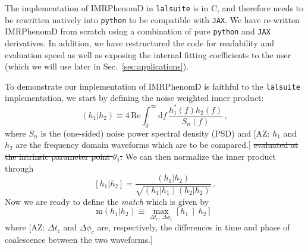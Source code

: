 \documentclass[twocolumn]{aastex631}
\newcommand{\jax}{\texttt{JAX}\xspace}
\newcommand{\lalsuite}{\texttt{lalsuite}\xspace}
\newcommand{\AZ}[1]{{\color{Burnt}[AZ: #1]}}
\begin{document}
The implementation of IMRPhenomD in \lalsuite is in C, and therefore needs to be rewritten natively into \texttt{python} to be compatible with \jax.
We have re-written IMRPhenomD from scratch using a combination of pure \texttt{python} and \jax derivatives.
In addition, we have restructured the code for readability and evaluation speed as well as exposing the internal fitting coefficients to the user (which we will use later in Sec.~\ref{sec:applications}).

To demonstrate our implementation of IMRPhenomD is faithful to the \lalsuite implementation, we start by defining the noise weighted inner product:
\begin{equation}
    \label{eq:inner_prod}
    \left(h_1|h_2\right) \equiv 4 \, \mathrm{Re} \int^{\infty}_{0} \mathrm{d} f \, \frac{ h^*_1(f) h_2(f)}{S_n(f)}\, ,
\end{equation}
where $S_n$ is the (one-sided) noise power spectral density (PSD) and \AZ{$h_1$ and $h_2$ are the frequency domain waveforms which are to be compared.}
\sout{ evaluated at the intrinsic parameter point $\theta_1$.}
We can then normalize the inner product through
\begin{equation}
    \left[h_1|h_2\right] = \frac{\left(h_1|h_2\right)}{\sqrt{\left(h_1|h_1\right)\left(h_2|h_2\right)}}\, .
\end{equation}
Now we are ready to define the \textit{match} which is given by 
\begin{equation}
    \mathrm{m}(h_1|h_2) \equiv \max_{\Delta t_c,\, \Delta \phi_c} \left[h_1 \, \middle| \, h_2 \right]\,
\end{equation}
where \AZ{$\Delta t_c$ and $\Delta \phi_c$ are, respectively, the differences in time and phase of coalescence between the two waveforms.}
\end{document}
